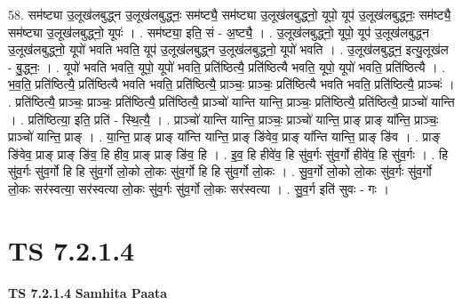 \documentclass[17pt]{extarticle}
\begin{document}
58. सम॑ष्ट्या उ॒लूख॑लबुद्ध्न उ॒लूख॑लबुद्ध्नः॒ सम॑ष्ट्यै॒ सम॑ष्ट्या उ॒लूख॑लबुद्ध्नो॒ यूपो॒ यूप॑ उ॒लूख॑लबुद्ध्नः॒ सम॑ष्ट्यै॒ सम॑ष्ट्या उ॒लूख॑लबुद्ध्नो॒ यूपः॑ । . सम॑ष्ट्या॒ इति॒ सं - अ॒ष्ट्यै॒ । . उ॒लूख॑लबुद्ध्नो॒ यूपो॒ यूप॑ उ॒लूख॑लबुद्ध्न उ॒लूख॑लबुद्ध्नो॒ यूपो॑ भवति भवति॒ यूप॑ उ॒लूख॑लबुद्ध्न उ॒लूख॑लबुद्ध्नो॒ यूपो॑ भवति । . उ॒लूख॑लबुद्ध्न॒ इत्यु॒लूख॑ल - बु॒द्ध्नः॒ । . यूपो॑ भवति भवति॒ यूपो॒ यूपो॑ भवति॒ प्रति॑ष्ठित्यै॒ प्रति॑ष्ठित्यै भवति॒ यूपो॒ यूपो॑ भवति॒ प्रति॑ष्ठित्यै । . भ॒व॒ति॒ प्रति॑ष्ठित्यै॒ प्रति॑ष्ठित्यै भवति भवति॒ प्रति॑ष्ठित्यै॒ प्राञ्चः॒ प्राञ्चः॒ प्रति॑ष्ठित्यै भवति भवति॒ प्रति॑ष्ठित्यै॒ प्राञ्चः॑ । . प्रति॑ष्ठित्यै॒ प्राञ्चः॒ प्राञ्चः॒ प्रति॑ष्ठित्यै॒ प्रति॑ष्ठित्यै॒ प्राञ्चो॑ यान्ति यान्ति॒ प्राञ्चः॒ प्रति॑ष्ठित्यै॒ प्रति॑ष्ठित्यै॒ प्राञ्चो॑ यान्ति । . प्रति॑ष्ठित्या॒ इति॒ प्रति॑ - स्थि॒त्यै॒ । . प्राञ्चो॑ यान्ति यान्ति॒ प्राञ्चः॒ प्राञ्चो॑ यान्ति॒ प्राङ् प्राङ् या᳚न्ति॒ प्राञ्चः॒ प्राञ्चो॑ यान्ति॒ प्राङ् । . या॒न्ति॒ प्राङ् प्राङ् या᳚न्ति यान्ति॒ प्राङ् ङि॑वेव॒ प्राङ् या᳚न्ति यान्ति॒ प्राङ् ङि॑व । . प्राङ् ङि॑वेव॒ प्राङ् प्राङ् ङि॑व॒ हि हीव॒ प्राङ् प्राङ् ङि॑व॒ हि । . इ॒व॒ हि हीवे॑व॒ हि सु॑व॒र्गः सु॑व॒र्गो हीवे॑व॒ हि सु॑व॒र्गः । . हि सु॑व॒र्गः सु॑व॒र्गो हि हि सु॑व॒र्गो लो॒को लो॒कः सु॑व॒र्गो हि हि सु॑व॒र्गो लो॒कः । . सु॒व॒र्गो लो॒को लो॒कः सु॑व॒र्गः सु॑व॒र्गो लो॒कः सर॑स्वत्या॒ सर॑स्वत्या लो॒कः सु॑व॒र्गः सु॑व॒र्गो लो॒कः सर॑स्वत्या । . सु॒व॒र्ग इति॑ सुवः - गः । \newline
\pagebreak
{}

\section{ TS 7.2.1.4 }

\textbf{TS 7.2.1.4 } \newline
\textbf{Samhita Paata} \newline
\end{document}
